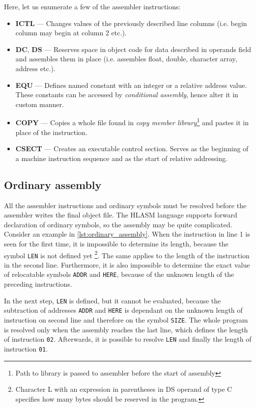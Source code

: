 Here, let us enumerate a few of the assembler instructions:
\begin{itemize}
	\item \textbf{ICTL} --- Changes values of the previously described line columns (i.e. begin column may begin at column 2 etc.).
	
	\item \textbf{DC}, \textbf{DS} --- Reserves space in object code for data described in operands field and assembles them in place (i.e. assembles float, double, character array, address etc.).
	
	\item \textbf{EQU} --- Defines named constant with an integer or a relative address value. These constants can be accessed by \emph{conditional assembly}, hence alter it in custom manner.
	
	\item \textbf{COPY} --- Copies a whole file found in \emph{copy member library}\footnote{Path to library is passed to assembler before the start of assembly} and pastes it in place of the instruction.
	
	\item \textbf{CSECT} --- Creates an executable control section. Serves as the beginning of a machine instruction sequence and as the start of relative addressing.
\end{itemize}

\subsection{Ordinary assembly}

All the assembler instructions and ordinary symbols must be resolved before the assembler writes the final object file. The HLASM language supports forward declaration of ordinary symbols, so the assembly may be quite complicated. Consider an example in \cref{lst:ordinary_assembly}. When the instruction in line 1 is seen for the first time, it is impossible to determine its length, because the symbol \verb|LEN| is not defined yet \footnote{Character L with an expression in parentheses in DS operand of type C specifies how many bytes should be reserved in the program.}. The same applies to the length of the instruction in the second line. Furthermore, it is also impossible to determine the exact value of relocatable symbols \verb|ADDR| and \verb|HERE|, because of the unknown length of the preceding instructions.

In the next step, \verb|LEN| is defined, but it cannot be evaluated, because the subtraction of addresses \verb|ADDR| and \verb|HERE| is dependant on the unknown length of instruction on second line and therefore on the symbol \verb|SIZE|. The whole program is resolved only when the assembly reaches the last line, which defines the length of instruction \verb|02|. Afterwards, it is possible to resolve \verb|LEN| and finally the length of instruction \verb|01|.

